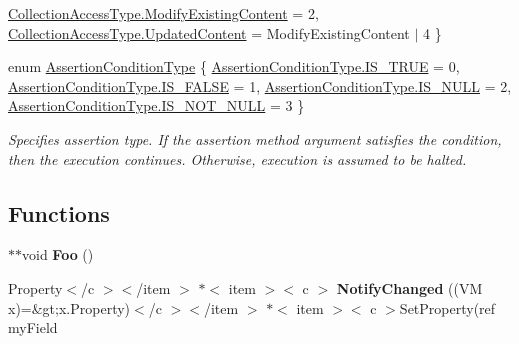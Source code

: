 \begin{DoxyCompactItemize}
\mbox{\hyperlink{namespace_r_f_storage_a0db1dea9793c2bb602b4a93dad0de1c6aabf21948b8bdc6b576703a901052dc09}{Collection\+Access\+Type.\+Modify\+Existing\+Content}} = 2, 
\mbox{\hyperlink{namespace_r_f_storage_a0db1dea9793c2bb602b4a93dad0de1c6a424cc5446574f01d7f484e158b23d001}{Collection\+Access\+Type.\+Updated\+Content}} = Modify\+Existing\+Content $\vert$ 4
 \}
\item 
enum \mbox{\hyperlink{namespace_r_f_storage_adc57200f58df721ce95677742004e92a}{Assertion\+Condition\+Type}} \{ \mbox{\hyperlink{namespace_r_f_storage_adc57200f58df721ce95677742004e92aa23cd5ba5c6eed3d82ba0c6c0526df429}{Assertion\+Condition\+Type.\+I\+S\+\_\+\+T\+R\+UE}} = 0, 
\mbox{\hyperlink{namespace_r_f_storage_adc57200f58df721ce95677742004e92aadeab83d56dee7ab418359a59b4ff2eb0}{Assertion\+Condition\+Type.\+I\+S\+\_\+\+F\+A\+L\+SE}} = 1, 
\mbox{\hyperlink{namespace_r_f_storage_adc57200f58df721ce95677742004e92aadbd9c38e0339e6c34bd48cafc59be388}{Assertion\+Condition\+Type.\+I\+S\+\_\+\+N\+U\+LL}} = 2, 
\mbox{\hyperlink{namespace_r_f_storage_adc57200f58df721ce95677742004e92aa05dd132ba23ff57c0ca5ec4100c31fdc}{Assertion\+Condition\+Type.\+I\+S\+\_\+\+N\+O\+T\+\_\+\+N\+U\+LL}} = 3
 \}
\begin{DoxyCompactList}\small\item\em Specifies assertion type. If the assertion method argument satisfies the condition, then the execution continues. Otherwise, execution is assumed to be halted. \end{DoxyCompactList}\end{DoxyCompactItemize}
\subsection*{Functions}
\begin{DoxyCompactItemize}
\item 
\mbox{\label{namespace_r_f_storage_a0398c9f69c59109e4095db0ab4bd6105}} 
$\ast$$\ast$void {\bfseries Foo} ()
\item 
\mbox{\label{namespace_r_f_storage_afc9f6f7351f532108ef8b65855d44f06}} 
Property$<$/c $>$$<$/item $>$ $\ast$$<$ item $>$$<$ c $>$ {\bfseries Notify\+Changed} ((VM x)=\&gt;x.\+Property)$<$/c $>$$<$/item $>$ $\ast$$<$ item $>$$<$ c $>$Set\+Property(ref my\+Field
\end{DoxyCompactItemize}
